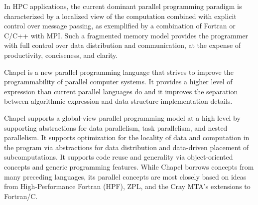 \label{Language_Overview}

In HPC applications, the current dominant parallel programming paradigm 
is characterized by a localized
view of the computation combined with explicit control
over message passing, as exemplified by a combination
of Fortran or C/C++ with MPI. Such a fragmented memory
model provides the programmer with full control over data
distribution and communication, at the expense of productivity,
conciseness, and clarity.

Chapel is a new parallel programming language that 
strives to improve the programmability of parallel computer systems.
It provides a higher level of expression 
than current parallel languages do and it improves the separation between 
algorithmic expression and data structure implementation details. 

Chapel supports a global-view parallel programming model at a high level by 
supporting abstractions for data parallelism, task parallelism, and nested parallelism. 
It supports optimization for the locality of data and computation in the program 
via abstractions for data distribution and data-driven placement of subcomputations. 
It supports code reuse and generality via object-oriented concepts and generic 
programming features. While Chapel borrows concepts from many preceding languages, 
its parallel concepts are most closely based on ideas from High-Performance Fortran 
(HPF), ZPL, and the Cray MTA's extensions to Fortran/C. 

